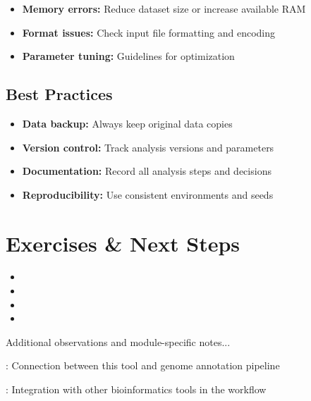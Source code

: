 \documentclass[a4paper,11pt]{article}
\begin{document}
\begin{itemize}
    \item \textbf{Memory errors:} Reduce dataset size or increase available RAM
    \item \textbf{Format issues:} Check input file formatting and encoding
    \item \textbf{Parameter tuning:} Guidelines for optimization
\end{itemize}

\subsection{Best Practices}
\begin{itemize}
    \item \textbf{Data backup:} Always keep original data copies
    \item \textbf{Version control:} Track analysis versions and parameters
    \item \textbf{Documentation:} Record all analysis steps and decisions
    \item \textbf{Reproducibility:} Use consistent environments and seeds
\end{itemize}

\section{Exercises \& Next Steps}

\begin{itemize}
    \item {}
    \item {}
    \item {}
    \item {}
\end{itemize}

\begin{notes}
Additional observations and module-specific notes...

: Connection between this tool and genome annotation pipeline

: Integration with other bioinformatics tools in the workflow

\end{notes}

\newpage
\printbibliography
\end{document}
